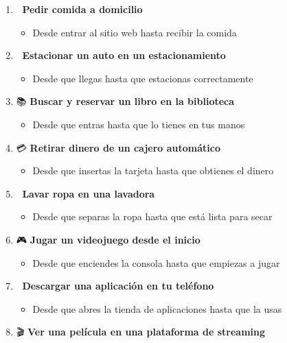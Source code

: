 \documentclass[
  spanish,
  12pt,
  letterpaper,
  DIV=11,
  numbers=noendperiod]{scrreprt}
\providecommand{\tightlist}{%
  \setlength{\itemsep}{0pt}\setlength{\parskip}{0pt}}
\begin{document}
\begin{enumerate}
\def\labelenumi{\arabic{enumi}.}
\tightlist
\item
  🍕 \textbf{Pedir comida a domicilio}

  \begin{itemize}
  \tightlist
  \item
    Desde entrar al sitio web hasta recibir la comida
  \end{itemize}
\item
  🚗 \textbf{Estacionar un auto en un estacionamiento}

  \begin{itemize}
  \tightlist
  \item
    Desde que llegas hasta que estacionas correctamente
  \end{itemize}
\item
  📚 \textbf{Buscar y reservar un libro en la biblioteca}

  \begin{itemize}
  \tightlist
  \item
    Desde que entras hasta que lo tienes en tus manos
  \end{itemize}
\item
  💳 \textbf{Retirar dinero de un cajero automático}

  \begin{itemize}
  \tightlist
  \item
    Desde que insertas la tarjeta hasta que obtienes el dinero
  \end{itemize}
\item
  🧺 \textbf{Lavar ropa en una lavadora}

  \begin{itemize}
  \tightlist
  \item
    Desde que separas la ropa hasta que está lista para secar
  \end{itemize}
\item
  🎮 \textbf{Jugar un videojuego desde el inicio}

  \begin{itemize}
  \tightlist
  \item
    Desde que enciendes la consola hasta que empiezas a jugar
  \end{itemize}
\item
  📱 \textbf{Descargar una aplicación en tu teléfono}

  \begin{itemize}
  \tightlist
  \item
    Desde que abres la tienda de aplicaciones hasta que la usas
  \end{itemize}
\item
  🎬 \textbf{Ver una película en una plataforma de streaming}


\end{enumerate}
\end{document}
